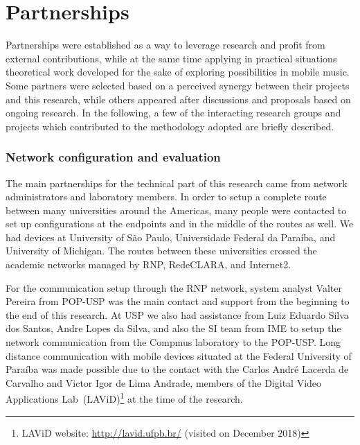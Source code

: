\chapter{Partnerships}
\label{ape:partnerships}

Partnerships were established as a way to leverage research and profit from external contributions, while at the same time applying in practical situations theoretical work developed for the sake of exploring possibilities in mobile music.
Some partners were selected based on a perceived synergy between their projects and this research, while others appeared after discussions and proposals based on ongoing research. In the following, a few of the interacting research groups and projects which contributed to the methodology adopted are briefly described.

\subsection*{Network configuration and evaluation}

The main partnerships for the technical part of this research came from network administrators and laboratory members.
In order to setup a complete route between many universities around the Americas, many people were contacted to set up configurations at the endpoints and in the middle of the routes as well.
We had devices at University of São Paulo, Universidade Federal da Paraíba, and University of Michigan.
The routes between these universities crossed the academic networks managed by RNP, RedeCLARA, and Internet2.

For the communication setup through the RNP network, system analyst Valter Pereira from POP-USP was the main contact and support from the beginning to the end of this research.
At USP we also had assistance from Luiz Eduardo Silva dos Santos, Andre Lopes da Silva, and also the SI team from IME to setup the network communication from the Compmus laboratory to the POP-USP.
Long distance communication with mobile devices situated at the Federal University of Paraíba was made possible due to the contact with the Carlos André Lacerda de Carvalho and Victor Igor de Lima Andrade, members of the Digital Video Applications Lab~(LAViD)\footnote{LAViD website: \url{http://lavid.ufpb.br/} (visited on December 2018)} at the time of the research.

